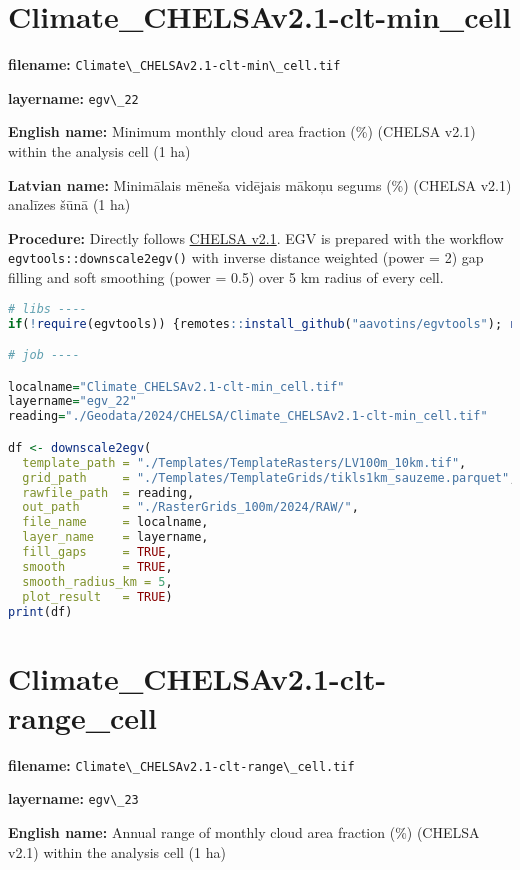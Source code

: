 \documentclass[
]{book}
\newcommand{\passthrough}[1]{#1}
\begin{document}
\section{Climate\_CHELSAv2.1-clt-min\_cell}\label{ch06.022}

\textbf{filename:} \passthrough{\lstinline!Climate\_CHELSAv2.1-clt-min\_cell.tif!}

\textbf{layername:} \passthrough{\lstinline!egv\_22!}

\textbf{English name:} Minimum monthly cloud area fraction (\%) (CHELSA v2.1) within the analysis cell (1 ha)

\textbf{Latvian name:} Minimālais mēneša vidējais mākoņu segums (\%) (CHELSA v2.1) analīzes šūnā (1 ha)

\textbf{Procedure:} Directly follows \hyperref[Ch04.11]{CHELSA v2.1}. EGV is prepared with the
workflow \passthrough{\lstinline!egvtools::downscale2egv()!} with inverse distance weighted (power = 2)
gap filling and soft smoothing (power = 0.5) over 5 km radius of every cell.

\begin{lstlisting}[language=R]
# libs ----
if(!require(egvtools)) {remotes::install_github("aavotins/egvtools"); require(egvtools)}

# job ----

localname="Climate_CHELSAv2.1-clt-min_cell.tif"
layername="egv_22"
reading="./Geodata/2024/CHELSA/Climate_CHELSAv2.1-clt-min_cell.tif"

df <- downscale2egv(
  template_path = "./Templates/TemplateRasters/LV100m_10km.tif",
  grid_path     = "./Templates/TemplateGrids/tikls1km_sauzeme.parquet",
  rawfile_path  = reading,
  out_path      = "./RasterGrids_100m/2024/RAW/",
  file_name     = localname,
  layer_name    = layername,
  fill_gaps     = TRUE,
  smooth        = TRUE,
  smooth_radius_km = 5,
  plot_result   = TRUE)
print(df)
\end{lstlisting}

\section{Climate\_CHELSAv2.1-clt-range\_cell}\label{ch06.023}

\textbf{filename:} \passthrough{\lstinline!Climate\_CHELSAv2.1-clt-range\_cell.tif!}

\textbf{layername:} \passthrough{\lstinline!egv\_23!}

\textbf{English name:} Annual range of monthly cloud area fraction (\%) (CHELSA v2.1) within the analysis cell (1 ha)
\end{document}
